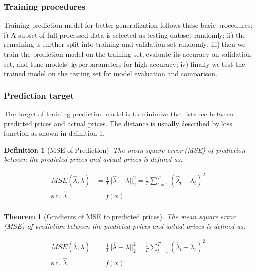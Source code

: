 \documentclass[journal]{IEEEtran}
\newtheorem{theorem}{Theorem}
\newtheorem{definition}{Definition}
\begin{document}
\subsubsection{Training procedures}
Training prediction model for better generalization follows these basic procedures: i) A subset of full processed data is selected as testing dataset randomly; ii) the remaining is further split into training and validation set randomly; iii) then we train the prediction model on the training set, evaluate its accuracy on validation set, and tune models' hyperparameters for high accuracy; iv) finally we test the trained model on the testing set for model evaluation and comparison. 

\subsubsection{Prediction target}
The target of training prediction model is to minimize the distance between predicted prices and actual prices. The distance is usually described by loss function as shown in definition 1.

\begin{definition}[MSE of Prediction]
  The mean square error (MSE) of prediction between the predicted prices and actual prices is defined as:  
\end{definition}
\begin{equation}
  \label{MSE}
  \begin{aligned}
    MSE(\hat{\lambda}, \lambda) &= \frac{1}{T} ||\hat{\lambda} - \lambda ||^2_2 = \frac{1}{T} \sum_{t=1}^T(\hat{\lambda}_t - \lambda_t)^2 \\
    \text{s.t. } \hat{\lambda} &= f(x) \\
  \end{aligned}
\end{equation}

\begin{theorem}[Gradients of MSE to predicted prices]
  The mean square error (MSE) of prediction between the predicted prices and actual prices is defined as:
\end{theorem}
\begin{equation}
  \label{gradientsofMSE}
  \begin{aligned}
    MSE(\hat{\lambda}, \lambda) &= \frac{1}{T} ||\hat{\lambda} - \lambda ||^2_2 = \frac{1}{T} \sum_{t=1}^T(\hat{\lambda}_t - \lambda_t)^2 \\
    \text{s.t. } \hat{\lambda} &= f(x) \\
  \end{aligned}
\end{equation}
\end{document}
